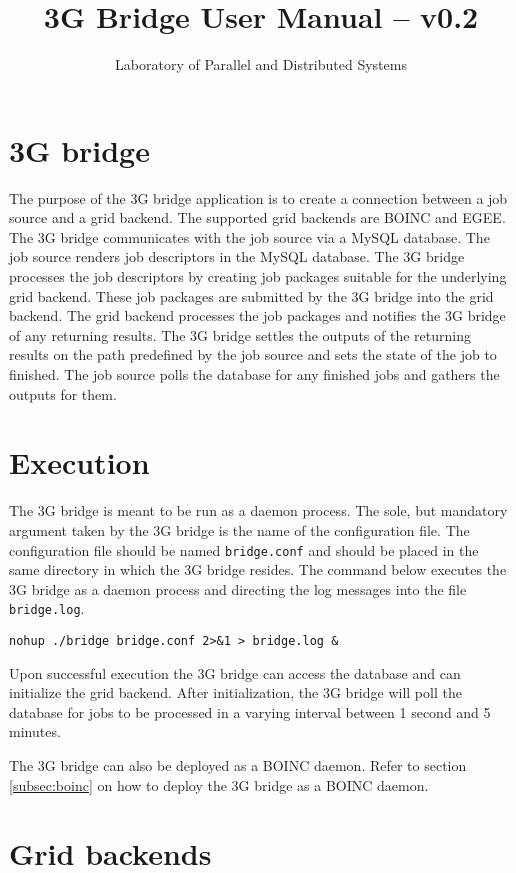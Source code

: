 \documentclass[a4paper, 12pt]{article}
\title{3G Bridge User Manual -- v0.2}
\author{Laboratory of Parallel and Distributed Systems}
\date{}
\begin{document}
 
\pagestyle{empty}
\maketitle
\thispagestyle{empty}

\section{3G bridge}

The purpose of the 3G bridge application is to create a connection between a job source and a grid backend. The supported grid backends are BOINC and EGEE. The 3G bridge communicates with the job source via a MySQL database. The job source renders job descriptors in the MySQL database. The 3G bridge processes the job descriptors by creating job packages suitable for the underlying grid backend. These job packages are submitted by the 3G bridge into the grid backend. The grid backend processes the job packages and notifies the 3G bridge of any returning results. The 3G bridge settles the outputs of the returning results on the path predefined by the job source and sets the state of the job to finished. The job source polls the database for any finished jobs and gathers the outputs for them.

\section{Execution}
The 3G bridge is meant to be run as a daemon process. The sole, but mandatory argument taken by the 3G bridge is the name of the configuration file. The configuration file should be named {\tt bridge.conf} and should be placed in the same directory in which the 3G bridge resides. The command below executes the 3G bridge as a daemon process and directing the log messages into the file {\tt bridge.log}.
\begin{verbatim}
nohup ./bridge bridge.conf 2>&1 > bridge.log &
\end{verbatim}
Upon successful execution the 3G bridge can access the database and can initialize the grid backend. After initialization, the 3G bridge will poll the database for jobs to be processed in a varying interval between 1 second and 5 minutes.

The 3G bridge can also be deployed as a BOINC daemon. Refer to section \ref{subsec:boinc} on how to deploy the 3G bridge as a BOINC daemon. 

\section{Grid backends}
\end{document}
